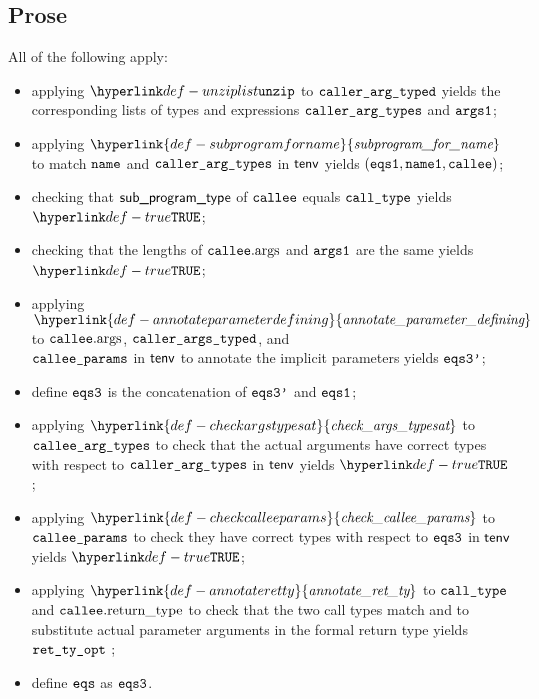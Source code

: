 \documentclass{book}
\newcommand\ProseOrTypeError[0]{\ProseTerminateAs{\TypeErrorConfig}}
\newcommand\checkargstypesat[0]{\hyperlink{def-checkargstypesat}{\textfunc{check\_args\_typesat}}}
\newcommand\checkcalleeparams[0]{\hyperlink{def-checkcalleeparams}{\textfunc{check\_callee\_params}}}
\newcommand\annotateretty[0]{\hyperlink{def-annotateretty}{\textfunc{annotate\_ret\_ty}}}
\newcommand\annotateparameterdefining[0]{\hyperlink{def-annotateparameterdefining}{\textfunc{annotate\_parameter\_defining}}}
\newcommand\subprogramforname[0]{\hyperlink{def-subprogramforname}{\textfunc{subprogram\_for\_name}}}
\begin{document}
\subsection{Prose}
All of the following apply:
\begin{itemize}
  \item applying $\unziplist$ to $\texttt{caller\_arg\_typed}$ yields the corresponding lists of types
        and expressions $\texttt{caller\_arg\_types}$ and $\texttt{args1}$;
  \item applying $\subprogramforname$ to match $\texttt{name}$ and $\texttt{caller\_arg\_types}$ in $\textsf{tenv}$
        yields $(\texttt{eqs1}, \texttt{name1}, \texttt{callee})$\ProseOrTypeError;
  \item checking that $\textsf{sub\_program\_type}$ of $\texttt{callee}$ equals $\texttt{call\_type}$ yields $\True$\ProseOrTypeError;
  \item checking that the lengths of $\texttt{callee}.\text{args}$ and $\texttt{args1}$ are the same yields $\True$\ProseOrTypeError;
  \item applying $\annotateparameterdefining$ to $\texttt{callee}.\text{args}$,
        $\texttt{caller\_args\_typed}$, and \\
        $\texttt{callee\_params}$ in $\textsf{tenv}$ to annotate the implicit parameters
        yields $\texttt{eqs3'}$\ProseOrTypeError;
  \item define $\texttt{eqs3}$ is the concatenation of $\texttt{eqs3'}$ and $\texttt{eqs1}$;
  \item applying $\checkargstypesat$ to $\texttt{callee\_arg\_types}$
        to check that the actual arguments have correct types with respect to $\texttt{caller\_arg\_types}$
        in $\textsf{tenv}$ yields $\True$\ProseOrTypeError;
  \item applying $\checkcalleeparams$ to $\texttt{callee\_params}$ to check they have correct types
        with respect to $\texttt{eqs3}$ in $\textsf{tenv}$ yields $\True$\ProseOrTypeError;
  \item applying $\annotateretty$ to $\texttt{call\_type}$ and $\texttt{callee}.\text{return\_type}$
        to check that the two call types match and to substitute actual parameter arguments in the formal return type
        yields $\texttt{ret\_ty\_opt}$ \ProseOrTypeError;
  \item define $\texttt{eqs}$ as $\texttt{eqs3}$.
\end{itemize}

\end{document}
